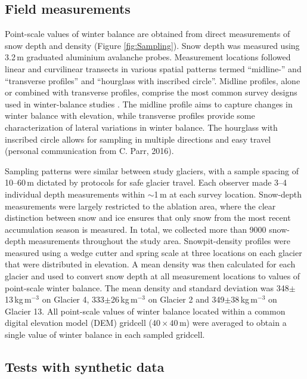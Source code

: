 \documentclass[twocolumn,letterpaper]{igs}
\begin{document}
\subsection{Field measurements}

Point-scale values of winter balance are obtained from direct measurements of snow depth and density (Figure \ref{fig:Sampling}). Snow depth was measured using  3.2\,m graduated aluminium avalanche probes. 
Measurement locations followed linear and curvilinear transects in various spatial patterns termed ``midline-'' and ``transverse profiles'' and ``hourglass with inscribed circle''. 
Midline profiles, alone or combined with transverse profiles, comprise the most common survey designs used in winter-balance studies \citep[e.g.][]{Kaser2002, Machguth2006}. The midline profile aims to capture changes in winter balance with elevation, while transverse profiles provide some characterization of lateral variations in winter balance. The hourglass with inscribed circle allows for sampling in multiple directions and easy travel (personal communication from C. Parr, 2016). 

Sampling patterns were similar between study glaciers, with a sample spacing of 10--60\,m dictated by protocols for safe glacier travel. Each observer made 3--4 individual depth measurements within $\sim$1\,m at each survey location. Snow-depth measurements were largely restricted to the ablation area, where the clear distinction between snow and ice ensures that only snow from the most recent accumulation season is measured. In total, we collected more than 9000 snow-depth measurements throughout the study area. Snowpit-density profiles were measured using a wedge cutter and spring scale at three locations on each glacier that were distributed in elevation. A mean density was then calculated for each glacier and used to convert snow depth at all measurement locations to values of point-scale winter balance. The mean density and standard deviation was 348$\pm$13\,kg\,m$^{-3}$ on Glacier 4, 333$\pm$26\,kg\,m$^{-3}$ on Glacier 2 and 349$\pm$38\,kg\,m$^{-3}$ on Glacier 13. All point-scale values of winter balance located within a common digital elevation model (DEM) gridcell ($40\times40$\,m) were averaged to obtain a single value of winter balance in each sampled gridcell. 

\subsection{Tests with synthetic data}
\end{document}
